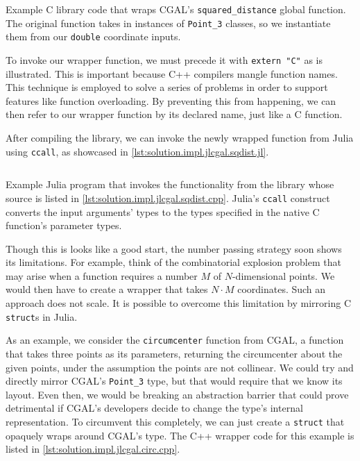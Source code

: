 \begin{listing}[htb]
  \inputminted{cpp}{cpp/sqdist.cpp}
  \caption[C wrapper for squared distance functionality]{
    Example C library code that wraps \ac{CGAL}'s \texttt{squared\_distance}
    global function.  The original function takes in instances of
    \texttt{Point\_3} classes, so we instantiate them from our
    \texttt{double} coordinate inputs.}%
  \label{lst:solution.impl.jlcgal.sqdist.cpp}
\end{listing}

To invoke our wrapper function, we must precede it with \texttt{extern
"C"} as is illustrated.  This is important because C++ compilers mangle function
names.  This technique is employed to solve a series of problems in order to
support features like function overloading. By preventing this from happening,
we can then refer to our wrapper function by its declared name, just like a C
function.

After compiling the library, we can invoke the newly wrapped function from Julia
using \texttt{ccall}, as showcased in
\cref{lst:solution.impl.jlcgal.sqdist.jl}.

\begin{listing}[htb]
  \inputminted{julia}{jl/sqdist.jl}
  \caption[Julia squared distance example program]{
    Example Julia program that invokes the functionality from the library whose
    source is listed in \cref{lst:solution.impl.jlcgal.sqdist.cpp}.  Julia's
    \texttt{ccall} construct converts the input arguments' types to
    the types specified in the native C function's parameter types.}%
  \label{lst:solution.impl.jlcgal.sqdist.jl}
\end{listing}

Though this is looks like a good start, the number passing strategy soon shows
its limitations. For example, think of the combinatorial explosion problem that
may arise when a function requires a number $M$ of $N$-dimensional points.  We
would then have to create a wrapper that takes $N\cdot M$ coordinates.  Such an
approach does not scale.  It is possible to overcome this limitation by
mirroring C \texttt{struct}s in Julia.

As an example, we consider the \texttt{circumcenter} function from \ac{CGAL}, a
function that takes three points as its parameters, returning the circumcenter
about the given points, under the assumption the points are not collinear.  We
could try and directly mirror \ac{CGAL}'s \texttt{Point\_3} type, but that would
require that we know its layout.  Even then, we would be breaking an abstraction
barrier that could prove detrimental if \ac{CGAL}'s developers decide to change
the type's internal representation.  To circumvent this completely, we can just
create a \texttt{struct} that opaquely wraps around \ac{CGAL}'s type.
The C++ wrapper code for this example is listed in
\cref{lst:solution.impl.jlcgal.circ.cpp}.

